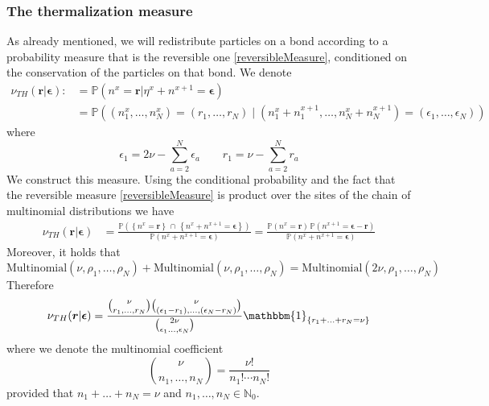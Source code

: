 \documentclass[10pt]{article}
\numberwithin{equation}{section}
\numberwithin{equation}{subsection}
\begin{document}
\subsubsection{The thermalization measure}
As already mentioned, we will redistribute particles on a bond according to a probability measure that is the reversible one \eqref{reversibleMeasure}, conditioned on the conservation of the particles on that bond. We denote
\begin{equation}
	\begin{split}
	\nu_{TH}(\bm{r}|\bm{\epsilon}):&=\mathbb{P}\left(n^{x}=\bm{r}|\eta^{x}+n^{x+1}=\bm{\epsilon}\right)
	\\&
	=\mathbb{P}\left((n_{1}^{x},\ldots,n_{N}^{x})=
	(r_{1},\ldots,r_{N})\;|\;(n_{1}^{x}+n_{1}^{x+1},\ldots,n_{N}^{x}+n_{N}^{x+1})=(\epsilon_{1},\ldots,\epsilon_{N})\right)
	\end{split}
\end{equation}
where
\begin{equation}
	\epsilon_{1}=2\nu-\sum_{a=2}^{N}\epsilon_{a}\qquad r_{1}=\nu-\sum_{a=2}^{N}r_{a}
\end{equation}
We construct this measure. Using the conditional probability and the fact that the reversible measure \eqref{reversibleMeasure} is product over the sites of the chain of multinomial distributions we have
\begin{equation}
	\begin{split}
\nu_{TH}(\bm{r}|\bm{\epsilon})&=\frac{\mathbb{P}\left(\left\{n^{x}=\bm{r}\right\}\,\cap\,\left\{n^{x}+n^{x+1}=\bm{\epsilon}\right\}\right)}{\mathbb{P}\left(n^{x}+n^{x+1}=\bm{\epsilon}\right)}=\frac{\mathbb{P}\left(n^{x}=\bm{r}\right)\,\mathbb{P}\left(n^{x+1}=\bm{\epsilon}-\bm{r}\right)}{\mathbb{P}\left(n^{x}+n^{x+1}=\bm{\epsilon}\right)}
	\end{split}
\end{equation}
Moreover, it holds that 
\begin{equation}
\text{Multinomial}(\nu,\rho_{1},\ldots,\rho_{N})+\text{Multinomial}(\nu,\rho_{1},\ldots,\rho_{N})=\text{Multinomial}(2\nu,\rho_{1},\ldots,\rho_{N})
\end{equation}
Therefore 
\begin{equation}
	\begin{split}
	\nu_{TH}(\bm{r}|\bm{\epsilon})=\frac{\binom{\nu}{r_{1},\ldots,r_{N}}\binom{\nu}{(\epsilon_{1}-r_{1}),\ldots,(\epsilon_{N}-r_{N})}}{\binom{2\nu}{\epsilon_{1}\ldots,\epsilon_{N}}}\mathbbm{1}_{\{r_{1}+\ldots+r_{N}=\nu\}}
	\end{split}
\end{equation}
where we denote the multinomial coefficient
\begin{equation}
	\binom{\nu}{n_{1},\ldots,n_{N}}=\frac{\nu!}{n_{1}!\cdots n_{N}!}
\end{equation}
provided that $n_{1}+\ldots+n_{N}=\nu$ and $n_{1},\ldots,n_{N}\in \mathbb{N}_{0}$. 
\end{document}
